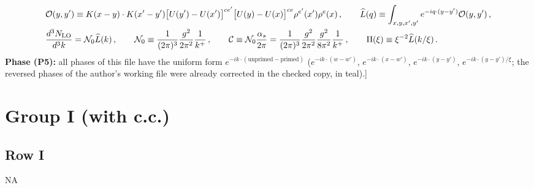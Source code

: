 \documentclass[9pt]{article}
\numberwithin{equation}{section}
\begin{document}
{\begin{align}
&\mathcal{O}(y,y')\equiv K(x-y)\cdot K(x'-y')\big[U(y')-U(x')\big]^{ce'}\big[U(y)-U(x)\big]^{ce}\rho^{e'}(x')\rho^{e}(x)\,,\qquad\widehat{L}(q)\equiv\int_{x,y,x',y'}e^{-iq\cdot(y-y')}\mathcal{O}(y,y')\,,\notag\\
&\frac{d^{3}N_{\rm LO}}{d^{3}k}=\mathcal{N}_{0}\widehat{L}(k)\,,\qquad\mathcal{N}_{0}\equiv\frac{1}{(2\pi)^{3}}\frac{g^{2}}{2\pi^{2}}\frac{1}{k^{+}}\,,\qquad\mathcal{C}\equiv\mathcal{N}_{0}\frac{\alpha_{s}}{2\pi}=\frac{1}{(2\pi)^{3}}\frac{g^{2}}{2\pi^{2}}\frac{g^{2}}{8\pi^{2}}\frac{1}{k^{+}}\,,\qquad\Pi(\xi)\equiv\xi^{-2}\widehat{L}(k/\xi)\,.\notag
\end{align}
\textbf{Phase (P5):} all phases of this file have the uniform form $e^{-ik\cdot(\text{unprimed}-\text{primed})}$ ($e^{-ik\cdot(w-w')}$, $e^{-ik\cdot(x-w')}$, $e^{-ik\cdot(y-y')}$, $e^{-ik\cdot(y-y')/\xi}$; the reversed phases of the author's working file were already corrected in the checked copy, in teal).]}\par

\section{Group I (with c.c.)}
\subsection{Row I}
\textsc{NA}
\end{document}
